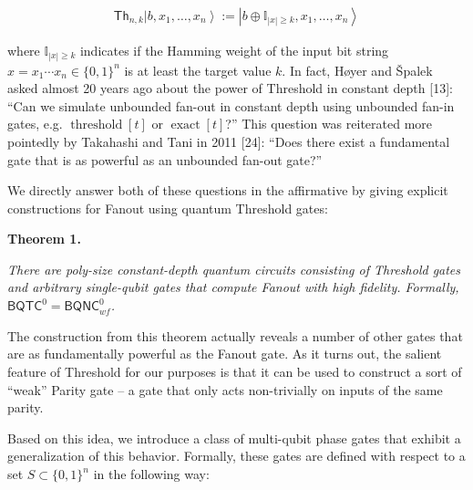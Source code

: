 \documentclass[10pt,a4paper]{article}
\begin{document}
\[\begin{gathered}
\mathsf{Th}_{n,k}\left|b,x_{1},\ldots,x_{n}\right\rangle:=\left|b\oplus\mathbb{I}_{|x|\geq k},x_{1},\ldots,x_{n}\right\rangle
\end{gathered}\]


where $\mathbb{I}_{|x|\geq k}$ indicates if the Hamming weight of the input bit string $x=x_{1}\cdots x_{n}\in\{0,1\}^{n}$ is at least the target value $k$. In fact, Høyer and Špalek asked almost 20 years ago about the power of Threshold in constant depth [13]: “Can we simulate unbounded fan-out in constant depth using unbounded fan-in gates, e.g. $\operatorname{threshold}[t]$ or $\operatorname{exact}[t]$?” This question was reiterated more pointedly by Takahashi and Tani in 2011 [24]: “Does there exist a fundamental gate that is as powerful as an unbounded fan-out gate?”\par




We directly answer both of these questions in the affirmative by giving explicit constructions for Fanout using quantum Threshold gates:\par





\par\medskip\noindent\textbf{
\textbf{Theorem 1}\textbf{.}
}\par



\emph{There are poly-size constant-depth quantum circuits consisting of Threshold gates and arbitrary single-qubit gates that compute Fanout with high fidelity. Formally, ${\mathsf{BQTC}}^{0}={\mathsf{BQNC}}^{0}_{wf}$.}\par






The construction from this theorem actually reveals a number of other gates that are as fundamentally powerful as the Fanout gate. As it turns out, the salient feature of Threshold for our purposes is that it can be used to construct a sort of “weak” Parity gate – a gate that only acts non-trivially on inputs of the same parity.\par




Based on this idea, we introduce a class of multi-qubit phase gates that exhibit a generalization of this behavior. Formally, these gates are defined with respect to a set $S\subset\{0,1\}^{n}$ in the following way:\par
\end{document}
